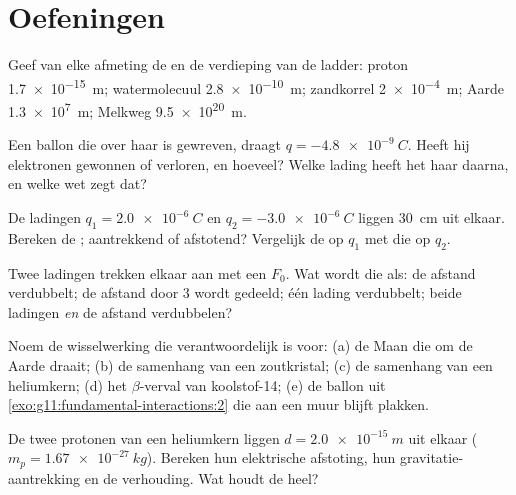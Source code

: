\section{Oefeningen}

\begin{exercise}[$\star$]\label{exo:g11:fundamental-interactions:1}
Geef van elke afmeting de  en de verdieping van de ladder:
proton \qty{1.7e-15}{m}; watermolecuul \qty{2.8e-10}{m}; zandkorrel
\qty{2e-4}{m}; Aarde \qty{1.3e7}{m}; Melkweg \qty{9.5e20}{m}.
\end{exercise}

\begin{exercise}[$\star$]\label{exo:g11:fundamental-interactions:2}
Een ballon die over haar is gewreven, draagt $q = \qty{-4.8e-9}{C}$.
Heeft hij elektronen gewonnen of verloren, en hoeveel? Welke lading heeft
het haar daarna, en welke wet zegt dat?
\end{exercise}

\begin{exercise}[$\star$]\label{exo:g11:fundamental-interactions:3}
De ladingen $q_1 = \qty{+2.0e-6}{C}$ en $q_2 = \qty{-3.0e-6}{C}$ liggen
\qty{30}{cm} uit elkaar. Bereken de ; aantrekkend of afstotend?
Vergelijk de  op $q_1$ met die op $q_2$.
\end{exercise}

\begin{exercise}[$\star$]\label{exo:g11:fundamental-interactions:4}
Twee ladingen trekken elkaar aan met een  $F_0$. Wat wordt die als:
de afstand verdubbelt; de afstand door $3$ wordt gedeeld; één lading
verdubbelt; beide ladingen \emph{en} de afstand verdubbelen?
\end{exercise}

\begin{exercise}[$\star$]\label{exo:g11:fundamental-interactions:5}
Noem de wisselwerking die verantwoordelijk is voor: (a) de Maan die om de
Aarde draait; (b) de samenhang van een zoutkristal; (c) de samenhang van
een heliumkern; (d) het $\beta$-verval van koolstof-14; (e) de ballon uit
\cref{exo:g11:fundamental-interactions:2} die aan een muur blijft
plakken.
\end{exercise}

\begin{exercise}[$\star\star$]\label{exo:g11:fundamental-interactions:6}
De twee protonen van een heliumkern liggen $d = \qty{2.0e-15}{m}$ uit
elkaar ($m_p = \qty{1.67e-27}{kg}$). Bereken hun elektrische afstoting,
hun gravitatie-aantrekking en de verhouding. Wat houdt de  heel?
\end{exercise}


